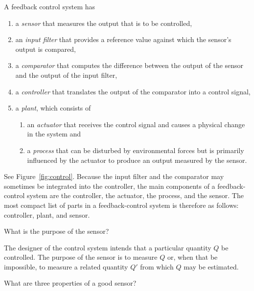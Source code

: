 \begin{solution}
   A feedback control system has
   \begin{enumerate}
      \item a \emph{sensor} that measures the output that is to be controlled,
      \item an \emph{input filter} that provides a reference value against
         which the sensor's output is compared,
      \item a \emph{comparator} that computes the difference between the output
         of the sensor and the output of the input filter,
      \item a \emph{controller} that translates the output of the comparator
         into a control signal,
      \item a \emph{plant}, which consists of
         \begin{enumerate}
            \item an \emph{actuator} that receives the control signal and
               causes a physical change in the system and
            \item a \emph{process} that can be disturbed by environmental
               forces but is primarily influenced by the actuator to produce an
               output measured by the sensor.
         \end{enumerate}
   \end{enumerate}
   See Figure~\ref{fig:control}. Because the input filter and the comparator
   may sometimes be integrated into the controller, the main components of a
   feedback-control system are the controller, the actuator, the process, and
   the sensor. The most compact list of parts in a feedback-control system is
   therefore as follows: controller, plant, and sensor.
\end{solution}

\begin{problem}
   What is the purpose of the sensor?
\end{problem}

\begin{solution}
   The designer of the control system intends that a particular quantity $Q$ be
   controlled. The purpose of the sensor is to measure $Q$ or, when that be
   impossible, to measure a related quantity $Q'$ from which $Q$ may be
   estimated.
\end{solution}

\begin{problem}
   What are three properties of a good sensor?
\end{problem}


